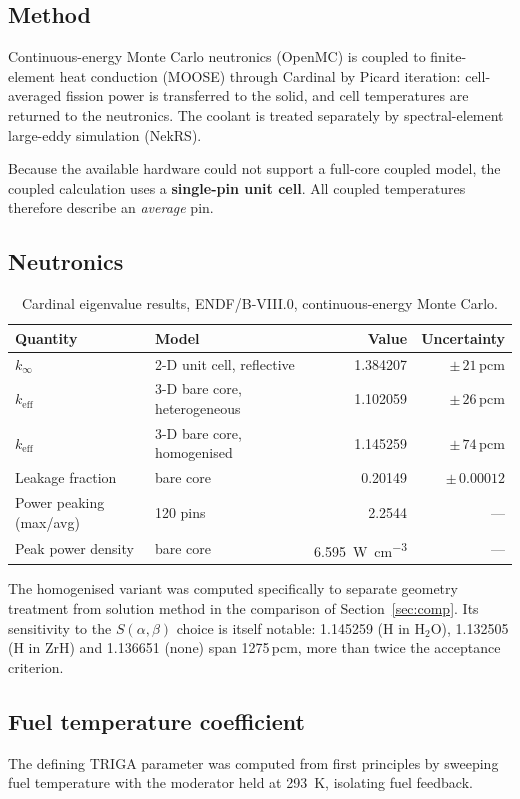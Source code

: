\documentclass[11pt,a4paper]{article}
\newcommand{\keff}{\ensuremath{k_{\mathrm{eff}}}}
\newcommand{\kinf}{\ensuremath{k_{\infty}}}
\newcommand{\pcm}{\,pcm}
\begin{document}
\subsection{Method}
Continuous-energy Monte Carlo neutronics (OpenMC) is coupled to finite-element heat
conduction (MOOSE) through Cardinal by Picard iteration: cell-averaged fission power is
transferred to the solid, and cell temperatures are returned to the neutronics. The coolant
is treated separately by spectral-element large-eddy simulation (NekRS).

Because the available hardware could not support a full-core coupled model, the coupled
calculation uses a \textbf{single-pin unit cell}. All coupled temperatures therefore
describe an \emph{average} pin.

\subsection{Neutronics}
\begin{table}[H]\centering\small
\caption{Cardinal eigenvalue results, ENDF/B-VIII.0, continuous-energy Monte Carlo.}
\begin{tabular}{@{}llrr@{}}
\toprule
\textbf{Quantity} & \textbf{Model} & \textbf{Value} & \textbf{Uncertainty}\\
\midrule
\kinf & 2-D unit cell, reflective & 1.384207 & $\pm\,21$\pcm\\
\keff & 3-D bare core, heterogeneous & 1.102059 & $\pm\,26$\pcm\\
\keff & 3-D bare core, homogenised & 1.145259 & $\pm\,74$\pcm\\
Leakage fraction & bare core & 0.20149 & $\pm\,0.00012$\\
Power peaking (max/avg) & 120 pins & 2.2544 & ---\\
Peak power density & bare core & \SI{6.595}{\watt\per\cubic\centi\meter} & ---\\
\bottomrule
\end{tabular}
\end{table}

The homogenised variant was computed specifically to separate geometry treatment from
solution method in the comparison of Section~\ref{sec:comp}. Its sensitivity to the
$S(\alpha,\beta)$ choice is itself notable: 1.145259 (H in H$_2$O), 1.132505 (H in ZrH) and
1.136651 (none) span 1275\pcm, more than twice the acceptance criterion.

\subsection{Fuel temperature coefficient}
The defining TRIGA parameter was computed from first principles by sweeping fuel temperature
with the moderator held at \SI{293}{\kelvin}, isolating fuel feedback.
\end{document}
